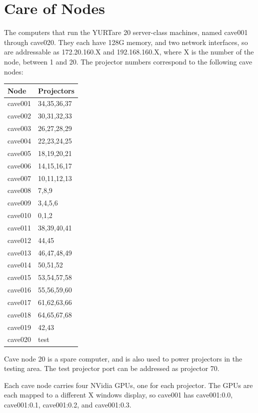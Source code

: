 \documentclass[11pt]{article}
\newcommand{\yurt}{YURT}
\begin{document}
\section{Care of Nodes}

The computers that run the \yurt are 20 server-class machines, named
cave001 through cave020.  They each have 128G memory, and two network
interfaces, so are addressable as 172.20.160.X and 192.168.160.X,
where X is the number of the node, between 1 and 20.  The projector
numbers correspond to the following cave nodes:

\begin{center}
\begin{tabular}{ll}
\textbf{Node} & \textbf{Projectors} \\ \hline
cave001 & 34,35,36,37 \\
cave002 & 30,31,32,33 \\
cave003 & 26,27,28,29 \\
cave004 & 22,23,24,25 \\
cave005 & 18,19,20,21 \\
cave006 & 14,15,16,17 \\
cave007 & 10,11,12,13 \\
cave008 & 7,8,9 \\
cave009 & 3,4,5,6 \\
cave010 & 0,1,2 \\
cave011 & 38,39,40,41 \\
cave012 & 44,45 \\
cave013 & 46,47,48,49 \\
cave014 & 50,51,52 \\
cave015 & 53,54,57,58 \\
cave016 & 55,56,59,60 \\
cave017 & 61,62,63,66 \\
cave018 & 64,65,67,68 \\
cave019 & 42,43 \\
cave020 & test \\
\end{tabular}
\end{center}

Cave node 20 is a spare computer, and is also used to power projectors
in the testing area.  The test projector port can be addressed as
projector 70.

Each cave node carries four NVidia GPUs, one for each projector.  The
GPUs are each mapped to a different X windows display, so cave001 has
cave001:0.0, cave001:0.1, cave001:0.2, and cave001:0.3.
\end{document}
